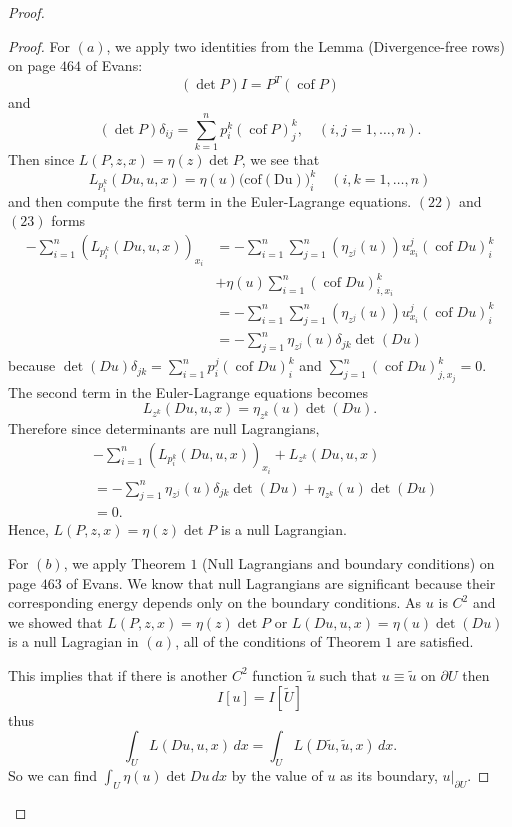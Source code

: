 \documentclass{article}
\begin{document}
\begin{flushleft}
\begin{proof}
\begin{proof}
For $(a)$, we apply two identities from the Lemma (Divergence-free rows) on page $464$ of Evans:
\begin{equation}(\det P)I = P^T(\operatorname{cof}P)\end{equation}
and
\begin{equation}(\det P)\delta_{ij}=\sum_{k=1}^n p^k_i(\operatorname{cof} P)^k_j,\quad (i,j=1,\ldots,n).\end{equation}
Then since $L(P,z,x)=\eta(z)\det P$, we see that
$$L_{p_i^k}(Du,u,x)=\eta(u)(\operatorname{cof(Du))}_i^k\quad(i,k=1,\ldots,n)$$
and then compute the first term in the Euler-Lagrange equations. $(22)$ and $(23)$ forms
\begin{align*}
-\sum_{i=1}^n \left(L_{p_i^k}(Du,u,x)\right)_{x_i}&= -\sum_{i=1}^n \sum_{j=1}^n \left(\eta_{z^j}(u)\right)u^j_{x_i}(\operatorname{cof} Du)_i^k \\&+\eta(u) \sum_{i=1}^n (\operatorname{cof} Du)_{i, x_i}^k\\&= 
-\sum_{i=1}^n \sum_{j=1}^n \left(\eta_{z^j}(u)\right)u^j_{x_i}(\operatorname{cof} Du)_i^k\\&=
-\sum_{j=1}^n\eta_{z^j}(u)\delta_{jk}\det(Du)    
\end{align*}
because $\det(Du) \delta_{jk} = \sum_{i=1}^n p_i^j(\operatorname{cof} Du)_i^k$ and $\sum_{j=1}^n (\operatorname{cof} Du)_{j,x_j}^k=0$. The second term in the Euler-Lagrange equations becomes
$$L_{z^k}(Du,u,x)=\eta_{z^k}(u)\det(Du).$$
Therefore since determinants are null Lagrangians,
\begin{align*}&-\sum_{i=1}^n \left(L_{p_i^k}(Du,u,x)\right)_{x_i} + L_{z^k}(Du,u,x) \\&= -\sum_{j=1}^n\eta_{z^j}(u)\delta_{jk}\det(Du)  + \eta_{z^k}(u)\det(Du)\\&=0.
\end{align*}
Hence, $L(P,z,x)=\eta(z)\det P$ is a null Lagrangian.

For $(b)$, we apply Theorem $1$ (Null Lagrangians and boundary conditions) on page $463$ of Evans. We know that null Lagrangians are significant because their corresponding energy depends only on the boundary conditions. As $u$ is $C^2$ and we showed that $L(P,z,x)=\eta(z)\det P$ or $L(Du,u,x)=\eta(u)\det (Du)$ is a null Lagragian in $(a)$, all of the conditions of Theorem $1$ are satisfied.

This implies that if there is another $C^2$ function $\tilde{u}$ such that $u\equiv \tilde{u}$ on $\partial U$ then 
$$I[u]=I[\tilde{U}]$$
thus
$$\int_U L(Du, u, x) \, dx = \int_U L(D\tilde{u}, \tilde{u}, x)\,dx.$$
So we can find $\int_U \eta(u)\det Du \,dx$ by the value of $u$ as its boundary, $u|_{\partial U}$.
\end{proof}

\end{proof}
\end{flushleft}
\end{document}

